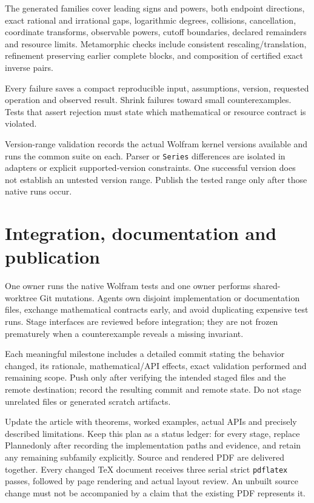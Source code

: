 \documentclass[11pt,a4paper]{article}
\newcommand{\wl}[1]{\texttt{#1}}
\newcommand{\planned}{\textsf{Planned}}
\begin{document}
The generated families cover leading signs and powers, both endpoint directions, exact rational and irrational gaps, logarithmic degrees, collisions, cancellation, coordinate transforms, observable powers, cutoff boundaries, declared remainders and resource limits. Metamorphic checks include consistent rescaling/translation, refinement preserving earlier complete blocks, and composition of certified exact inverse pairs.

Every failure saves a compact reproducible input, assumptions, version, requested operation and observed result. Shrink failures toward small counterexamples. Tests that assert rejection must state which mathematical or resource contract is violated.

Version-range validation records the actual Wolfram kernel versions available and runs the common suite on each. Parser or \wl{Series} differences are isolated in adapters or explicit supported-version constraints. One successful version does not establish an untested version range. Publish the tested range only after those native runs occur.

\clearpage
\section{Integration, documentation and publication}

One owner runs the native Wolfram tests and one owner performs shared-worktree Git mutations. Agents own disjoint implementation or documentation files, exchange mathematical contracts early, and avoid duplicating expensive test runs. Stage interfaces are reviewed before integration; they are not frozen prematurely when a counterexample reveals a missing invariant.

Each meaningful milestone includes a detailed commit stating the behavior changed, its rationale, mathematical/API effects, exact validation performed and remaining scope. Push only after verifying the intended staged files and the remote destination; record the resulting commit and remote state. Do not stage unrelated files or generated scratch artifacts.

Update the article with theorems, worked examples, actual APIs and precisely described limitations. Keep this plan as a status ledger: for every stage, replace \planned only after recording the implementation paths and evidence, and retain any remaining subfamily explicitly. Source and rendered PDF are delivered together. Every changed TeX document receives three serial strict \wl{pdflatex} passes, followed by page rendering and actual layout review. An unbuilt source change must not be accompanied by a claim that the existing PDF represents it.
\end{document}
